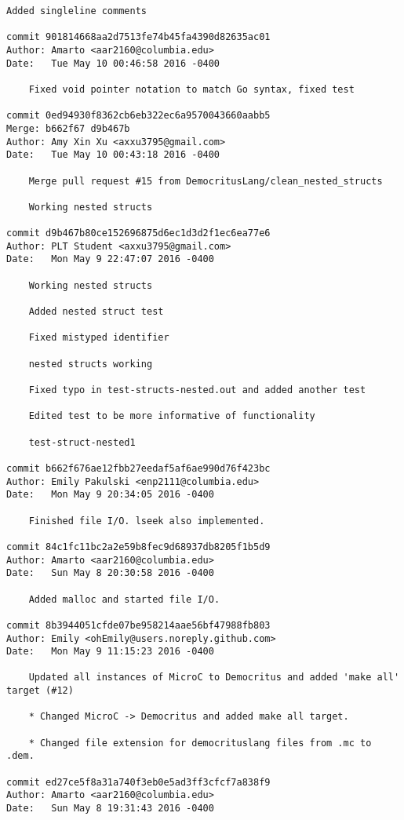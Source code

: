 \begin{lstlisting}[backgroundcolor=\color{white}]
    Added singleline comments

commit 901814668aa2d7513fe74b45fa4390d82635ac01
Author: Amarto <aar2160@columbia.edu>
Date:   Tue May 10 00:46:58 2016 -0400

    Fixed void pointer notation to match Go syntax, fixed test

commit 0ed94930f8362cb6eb322ec6a9570043660aabb5
Merge: b662f67 d9b467b
Author: Amy Xin Xu <axxu3795@gmail.com>
Date:   Tue May 10 00:43:18 2016 -0400

    Merge pull request #15 from DemocritusLang/clean_nested_structs
    
    Working nested structs

commit d9b467b80ce152696875d6ec1d3d2f1ec6ea77e6
Author: PLT Student <axxu3795@gmail.com>
Date:   Mon May 9 22:47:07 2016 -0400

    Working nested structs
    
    Added nested struct test
    
    Fixed mistyped identifier
    
    nested structs working
    
    Fixed typo in test-structs-nested.out and added another test
    
    Edited test to be more informative of functionality
    
    test-struct-nested1

commit b662f676ae12fbb27eedaf5af6ae990d76f423bc
Author: Emily Pakulski <enp2111@columbia.edu>
Date:   Mon May 9 20:34:05 2016 -0400

    Finished file I/O. lseek also implemented.

commit 84c1fc11bc2a2e59b8fec9d68937db8205f1b5d9
Author: Amarto <aar2160@columbia.edu>
Date:   Sun May 8 20:30:58 2016 -0400

    Added malloc and started file I/O.

commit 8b3944051cfde07be958214aae56bf47988fb803
Author: Emily <ohEmily@users.noreply.github.com>
Date:   Mon May 9 11:15:23 2016 -0400

    Updated all instances of MicroC to Democritus and added 'make all' target (#12)
    
    * Changed MicroC -> Democritus and added make all target.
    
    * Changed file extension for democrituslang files from .mc to .dem.

commit ed27ce5f8a31a740f3eb0e5ad3ff3cfcf7a838f9
Author: Amarto <aar2160@columbia.edu>
Date:   Sun May 8 19:31:43 2016 -0400


\end{lstlisting}
